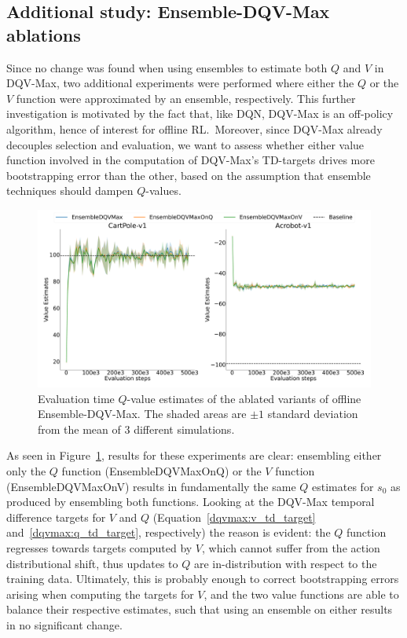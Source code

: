 \subsection{Additional study: Ensemble-DQV-Max ablations}
Since no change was found when using ensembles to estimate both $Q$
and $V$ in DQV-Max, two additional experiments were performed where
either the $Q$ or the $V$ function were approximated by an ensemble,
respectively. This further investigation is motivated by the fact
that, like DQN, DQV-Max is an off-policy algorithm, hence of interest
for offline RL.\ Moreover, since DQV-Max already decouples selection
and evaluation, we want to assess whether either value function
involved in the computation of DQV-Max's TD-targets drives more
bootstrapping error than the other, based on the assumption that
ensemble techniques should dampen $Q$-values.
\begin{figure}[h]
  \centering
  \includegraphics[width=.5\textwidth]{img/dshift_plots_ablation_qv.png}
  \caption{Evaluation time $Q$-value estimates of the ablated variants
    of offline Ensemble-DQV-Max. The shaded areas are $\pm 1$ standard
    deviation from the mean of 3 different
    simulations.}\label{fig:dshift_dqvmax_ablations}
\end{figure}
As seen in Figure~\ref{fig:dshift_dqvmax_ablations}, results for these
experiments are clear: ensembling either only the $Q$ function
(EnsembleDQVMaxOnQ) or the $V$ function (EnsembleDQVMaxOnV) results in
fundamentally the same $Q$ estimates for $s_0$ as produced by
ensembling both functions. Looking at the DQV-Max temporal difference
targets for $V$ and $Q$ (Equation~\ref{dqvmax:v_td_target}
and~\ref{dqvmax:q_td_target}, respectively) the reason is evident: the
$Q$ function regresses towards targets computed by $V$, which cannot
suffer from the action distributional shift, thus updates to $Q$ are
in-distribution with respect to the training data. Ultimately, this is
probably enough to correct bootstrapping errors arising when computing
the targets for $V$, and the two value functions are able to balance
their respective estimates, such that using an ensemble on either
results in no significant change.
